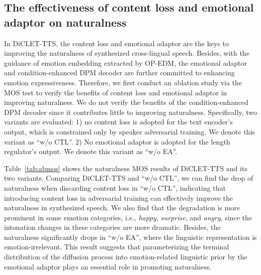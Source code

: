 \documentclass[journal,comsoc]{IEEEtran}
\begin{document}
\subsection{The effectiveness of content loss and emotional adaptor on naturalness}
\label{abneu}
In DiCLET-TTS, the content loss and emotional adaptor are the keys to improving the naturalness of synthesized cross-lingual speech.
Besides, with the guidance of emotion embedding extracted by OP-EDM, the emotional adaptor and condition-enhanced DPM decoder are further committed to enhancing emotion expressiveness.
Therefore, we first conduct an ablation study via the MOS test to verify the benefits of content loss and emotional adaptor in improving naturalness. 
We do not verify the benefits of the condition-enhanced DPM decoder since it contributes little to improving naturalness.
Specifically, two variants are evaluated: 
1) no content loss is adopted for the text encoder's output, which is constrained only by speaker adversarial training. We denote this variant as ``w/o CTL''. 
2) No emotional adaptor is adopted for the length regulator's output.
We denote this variant as ``w/o EA''.

Table~\ref{tab:abmos} shows the naturalness MOS results of DiCLET-TTS and its two variants. 
Comparing DiCLET-TTS and ``w/o CTL'', we can find the drop of naturalness when discarding content loss in ``w/o CTL'', indicating that introducing content loss in adversarial training can effectively improve the naturalness in synthesized speech.
We also find that the degradation is more prominent in some emotion categories, i.e., \textit{happy, surprise}, and \textit{angry}, since the intonation changes in these categories are more dramatic.
Besides, the naturalness significantly drops in ``w/o EA'', where the linguistic representation is emotion-irrelevant.
This result suggests that parameterizing the terminal distribution of the diffusion process into emotion-related linguistic prior by the emotional adaptor plays an essential role in promoting naturalness.
\end{document}
